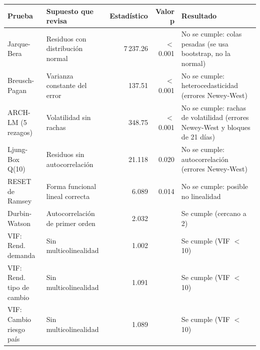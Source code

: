 \begin{tabularx}{\linewidth}{>{\raggedright\arraybackslash}X>{\raggedright\arraybackslash}Xrr>{\raggedright\arraybackslash}X}
\toprule
Prueba & Supuesto que revisa & Estadístico & Valor p & Resultado \\
\midrule
Jarque-Bera & Residuos con distribución normal & 7\,237.26 & $<$0.001 & No se cumple: colas pesadas (se usa bootstrap, no la normal) \\
Breusch-Pagan & Varianza constante del error & 137.51 & $<$0.001 & No se cumple: heterocedasticidad (errores Newey-West) \\
ARCH-LM (5 rezagos) & Volatilidad sin rachas & 348.75 & $<$0.001 & No se cumple: rachas de volatilidad (errores Newey-West y bloques de 21 días) \\
Ljung-Box Q(10) & Residuos sin autocorrelación & 21.118 & 0.020 & No se cumple: autocorrelación (errores Newey-West) \\
RESET de Ramsey & Forma funcional lineal correcta & 6.089 & 0.014 & No se cumple: posible no linealidad \\
Durbin-Watson & Autocorrelación de primer orden & 2.032 &  & Se cumple (cercano a 2) \\
VIF: Rend. demanda & Sin multicolinealidad & 1.002 &  & Se cumple (VIF $<$ 10) \\
VIF: Rend. tipo de cambio & Sin multicolinealidad & 1.091 &  & Se cumple (VIF $<$ 10) \\
VIF: Cambio riesgo país & Sin multicolinealidad & 1.089 &  & Se cumple (VIF $<$ 10) \\
\bottomrule
\end{tabularx}
